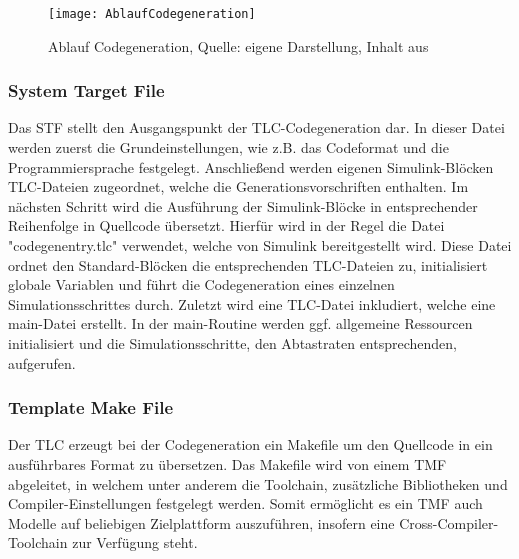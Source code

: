 \begin{figure}[h]
	\texttt{[image: AblaufCodegeneration]}
	\caption{Ablauf Codegeneration, Quelle: eigene Darstellung, Inhalt aus \cite{TLC}}
\end{figure}

\subsubsection{System Target File}
Das \ac{STF} stellt den Ausgangspunkt der \ac{TLC}-Codegeneration dar. In dieser Datei werden zuerst die Grundeinstellungen, wie z.B. das Codeformat und die Programmiersprache festgelegt. Anschließend werden eigenen Simulink-Blöcken TLC-Dateien zugeordnet, welche die Generationsvorschriften enthalten. Im nächsten Schritt wird die Ausführung der Simulink-Blöcke in entsprechender Reihenfolge in Quellcode übersetzt. Hierfür wird in der Regel die Datei "codegenentry.tlc" verwendet, welche von Simulink bereitgestellt wird. Diese Datei ordnet den Standard-Blöcken die entsprechenden TLC-Dateien zu, initialisiert globale Variablen und führt die Codegeneration eines einzelnen Simulationsschrittes durch. Zuletzt wird eine TLC-Datei inkludiert, welche eine main-Datei erstellt. In der main-Routine werden ggf. allgemeine Ressourcen initialisiert und die Simulationsschritte, den Abtastraten entsprechenden, aufgerufen.

\subsubsection{Template Make File}
Der \ac{TLC} erzeugt bei der Codegeneration ein Makefile um den Quellcode in ein ausführbares Format zu übersetzen. Das Makefile wird von einem \ac{TMF} abgeleitet, in welchem unter anderem die Toolchain, zusätzliche Bibliotheken und Compiler-Einstellungen festgelegt werden. Somit ermöglicht es ein \ac{TMF} auch Modelle auf beliebigen Zielplattform auszuführen, insofern eine Cross-Compiler-Toolchain zur Verfügung steht.